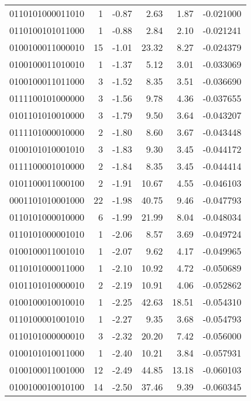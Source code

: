 \begin{tabular}{lrrrrr}
0110101000011010 &         1 &     -0.87 &     2.63 &     1.87 & -0.021000 \\
0110100101011000 &         1 &     -0.88 &     2.84 &     2.10 & -0.021241 \\
0100100011000010 &        15 &     -1.01 &    23.32 &     8.27 & -0.024379 \\
0100100011010010 &         1 &     -1.37 &     5.12 &     3.01 & -0.033069 \\
0100100011011000 &         3 &     -1.52 &     8.35 &     3.51 & -0.036690 \\
0111100101000000 &         3 &     -1.56 &     9.78 &     4.36 & -0.037655 \\
0101101010010000 &         3 &     -1.79 &     9.50 &     3.64 & -0.043207 \\
0111101000010000 &         2 &     -1.80 &     8.60 &     3.67 & -0.043448 \\
0100101010001010 &         3 &     -1.83 &     9.30 &     3.45 & -0.044172 \\
0111100001010000 &         2 &     -1.84 &     8.35 &     3.45 & -0.044414 \\
0101100011000100 &         2 &     -1.91 &    10.67 &     4.55 & -0.046103 \\
0001101010001000 &        22 &     -1.98 &    40.75 &     9.46 & -0.047793 \\
0110101000010000 &         6 &     -1.99 &    21.99 &     8.04 & -0.048034 \\
0110101000001010 &         1 &     -2.06 &     8.57 &     3.69 & -0.049724 \\
0100100011001010 &         1 &     -2.07 &     9.62 &     4.17 & -0.049965 \\
0110101000011000 &         1 &     -2.10 &    10.92 &     4.72 & -0.050689 \\
0101101010000010 &         2 &     -2.19 &    10.91 &     4.06 & -0.052862 \\
0100100010010010 &         1 &     -2.25 &    42.63 &    18.51 & -0.054310 \\
0110100001001010 &         1 &     -2.27 &     9.35 &     3.68 & -0.054793 \\
0110101000000010 &         3 &     -2.32 &    20.20 &     7.42 & -0.056000 \\
0100101010011000 &         1 &     -2.40 &    10.21 &     3.84 & -0.057931 \\
0100100011001000 &        12 &     -2.49 &    44.85 &    13.18 & -0.060103 \\
0100100010010100 &        14 &     -2.50 &    37.46 &     9.39 & -0.060345 \\

\end{tabular}
